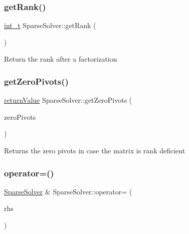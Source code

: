\subsubsection{\texorpdfstring{get\+Rank()}{getRank()}}
{\footnotesize\ttfamily \hyperlink{_types_8hpp_ab6fd6105e64ed14a0c9281326f05e623}{int\+\_\+t} Sparse\+Solver\+::get\+Rank (\begin{DoxyParamCaption}{ }\end{DoxyParamCaption})\hspace{0.3cm}{\ttfamily [virtual]}}

Return the rank after a factorization \mbox{\label{class_sparse_solver_a0c5a2e2132ccec5732252f1786998406}} 
\subsubsection{\texorpdfstring{get\+Zero\+Pivots()}{getZeroPivots()}}
{\footnotesize\ttfamily \hyperlink{_message_handling_8hpp_a81d556f613bfbabd0b1f9488c0fa865e}{return\+Value} Sparse\+Solver\+::get\+Zero\+Pivots (\begin{DoxyParamCaption}\item[{\hyperlink{_types_8hpp_ab6fd6105e64ed14a0c9281326f05e623}{int\+\_\+t} $\ast$\&}]{zero\+Pivots }\end{DoxyParamCaption})\hspace{0.3cm}{\ttfamily [virtual]}}

Returns the zero pivots in case the matrix is rank deficient \mbox{\label{class_sparse_solver_a1215b429a4ca226cac50b67ca78ec78a}} 
\subsubsection{\texorpdfstring{operator=()}{operator=()}}
{\footnotesize\ttfamily \hyperlink{class_sparse_solver}{Sparse\+Solver} \& Sparse\+Solver\+::operator= (\begin{DoxyParamCaption}\item[{const \hyperlink{class_sparse_solver}{Sparse\+Solver} \&}]{rhs }\end{DoxyParamCaption})\hspace{0.3cm}{\ttfamily [virtual]}}

